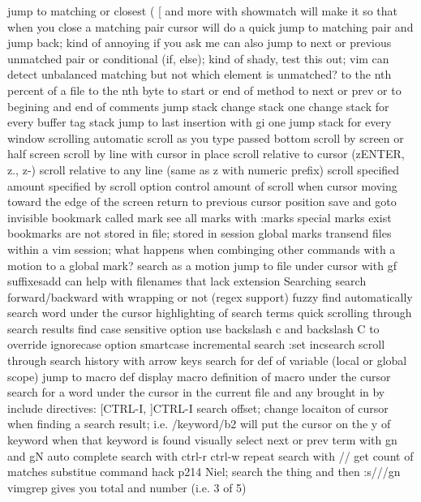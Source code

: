 \documentclass[12pt]{book}
\begin{document}
      jump to matching or closest ( { [ and more with %
        showmatch will make it so that when you close a matching pair cursor will do a quick jump to matching pair and jump back; kind of annoying if you ask me
        can also jump to next or previous unmatched pair or conditional (if, else); kind of shady, test this out; vim can detect unbalanced matching but not which element is unmatched?
      to the nth percent of a file
      to the nth byte
      to start or end of method
      to next or prev { or }
      to begining and end of comments
      jump stack
      change stack
        one change stack for every buffer
      tag stack
      jump to last insertion with gi
        one jump stack for every window
    scrolling
      automatic scroll as you type passed bottom
      scroll by screen or half screen
      scroll by line with cursor in place
      scroll relative to cursor (zENTER, z., z-)
      scroll relative to any line (same as z with numeric prefix)
      scroll specified amount specified by scroll option
      control amount of scroll when cursor moving toward the edge of the screen
    return to previous cursor position
    save and goto invisible bookmark called mark
      see all marks with :marks
      special marks exist
      bookmarks are not stored in file; stored in session
      global marks transend files within a vim session; what happens when combinging other commands with a motion to a global mark?
    search as a motion
    jump to file under cursor with gf
      suffixesadd can help with filenames that lack extension
Searching
  search forward/backward with wrapping or not (regex support)
  fuzzy find
  automatically search word under the cursor
  highlighting of search terms
  quick scrolling through search results
  find
  case sensitive option
    use backslash c and backslash C to override ignorecase option
    smartcase
  incremental search :set incsearch
  scroll through search history with arrow keys
  search for def of variable (local or global scope)
  jump to macro def
  display macro definition of macro under the cursor
  search for a word under the cursor in the current file and any brought in by include directives: [CTRL-I, ]CTRL-I
  search offset; change locaiton of cursor when finding a search result; i.e. /keyword/b2 will put the cursor on the y of keyword when that keyword is found
  visually select next or prev term with gn and gN
  auto complete search with ctrl-r ctrl-w
  repeat search with //
  get count of matches
    substitue command hack p214 Niel; search the thing and then :s///gn
    vimgrep gives you total and number (i.e. 3 of 5)
}
\end{document}
